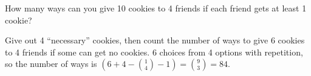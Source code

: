\question How many ways can you give 10 cookies to 4 friends if each 
friend gets at least 1 cookie?

\begin{solution}[2 cm]
Give out 4 “necessary” cookies, then count the number of ways to give 
6 cookies to 4 friends if some can get no cookies. 6 choices from 4 
options with repetition, so the number of ways is  
$(6 + 4 - {1\choose 4} - 1)  =  {9 \choose 3}  = 84.$
\end{solution}